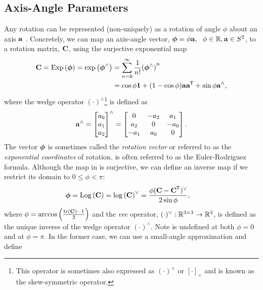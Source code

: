 
\subsection{Axis-Angle Parameters}

Any rotation can be represented (non-uniquely) as a rotation of angle $\phi$ about an axis $\boldsymbol{\mathbf{a}}$ \citep{Hartley2013-rc}. Concretely, we can map an axis-angle vector, $\boldsymbol{\mathbf{\phi}} = \phi \boldsymbol{\mathbf{a}}, ~~ \phi \in \mathbb{R}{}, \boldsymbol{\mathbf{a}} \in S^2$, to a rotation matrix, $\boldsymbol{\mathbf{C}}$, using the surjective exponential map 
\begin{align}
\label{eq:so3_exp}
\boldsymbol{\mathbf{C}} = \mathrm{Exp}\left({\boldsymbol{\mathbf{\phi}}}\right) = \mathrm{exp}\left({\boldsymbol{\mathbf{\phi}}}^{\wedge}\right) &= \sum_{n=0}^{\infty}  \frac{1}{n!} {(\boldsymbol{\mathbf{\phi}}^\wedge)}^n\\
\label{eq:euler_rodriguez}
&= \cos{\phi} \boldsymbol{\mathbf{1}} + (1 - \cos{\phi}) \boldsymbol{\mathbf{a}}\boldsymbol{\mathbf{a}}^{\mkern-1.0mu\mathsf{T}} + \sin{\phi} \boldsymbol{\mathbf{a}}^\wedge,
\end{align}
where the wedge operator $(\cdot)^\wedge$\footnote{This operator is sometimes also expressed as $(\cdot)^\times$ or $[\cdot]_\times$ and is known as the skew-symmetric operator.} is defined as
\begin{equation}
\boldsymbol{\mathbf{a}}^\wedge = \begin{bmatrix} a_0 \\ a_1 \\ a_2 \end{bmatrix}^\wedge = \begin{bmatrix} 0 & -a_2 & a_1 \\ a_2 & 0 & -a_0 \\ -a_1 & a_0 & 0 \end{bmatrix}.	
\end{equation}
The vector $\boldsymbol{\mathbf{\phi}}$ is sometimes called the \textit{rotation vector} \citep{Barfoot2017-ri} or referred to as the \textit{exponential coordinates} \citep{Gallego2015} of rotation.  is often referred to as the Euler-Rodriguez formula. Although the map in  is surjective, we can define an inverse map if we restrict its domain to $0 \leq \phi < \pi$:
\begin{align}
\label{eq:so3_log}
\boldsymbol{\mathbf{\phi}} =  \mathrm{Log}\left({\boldsymbol{\mathbf{C}}}\right) = \mathrm{log}\left({\boldsymbol{\mathbf{C}}}\right)^{\vee} &= \frac{\phi (\boldsymbol{\mathbf{C}} - \boldsymbol{\mathbf{C}}^{\mkern-1.0mu\mathsf{T}})^\vee}{2 \sin{\phi}}, 
\end{align}
where $\phi = \arccos{\left(\frac{ \mathrm{tr}\left(  \boldsymbol{\mathbf{C}}  \right)  - 1}{2}\right)}$ and the \textit{vee} operator, $(\cdot)^\vee : \mathbb{R}{}^{3 \times 3} \rightarrow \mathbb{R}{}^3$, is defined as the unique inverse of the wedge operator $(\cdot)^\wedge$. Note  is undefined at both $\phi = 0$ and at $\phi = \pi$. In the former case, we can use a small-angle approximation and define

